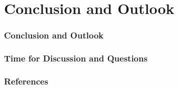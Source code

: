 \documentclass{beamer}
\begin{document}
\section{Conclusion and Outlook}
\begin{frame}
    \frametitle{Conclusion and Outlook}
    
\end{frame}

\begin{frame}
    \frametitle{Time for Discussion and Questions}
    
\end{frame}
\begin{frame}
    \frametitle{References}
    \printbibliography
\end{frame}
\end{document}
